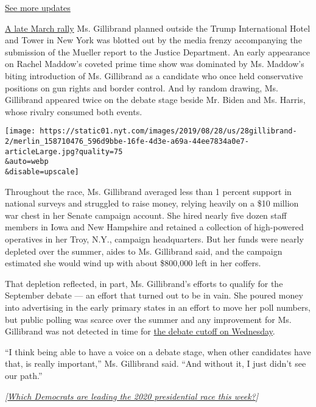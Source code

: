 \href{https://www.nytimes.com/2020/07/31/us/elections/biden-vs-trump.html?action=click\&pgtype=Article\&state=default\&region=MAIN_CONTENT_1\&context=storylines_live_updates}{See
more updates}

\href{https://www.nytimes.com/2019/03/24/us/politics/gillibrand-trump-2020.html}{A
late March rally} Ms. Gillibrand planned outside the Trump International
Hotel and Tower in New York was blotted out by the media frenzy
accompanying the submission of the Mueller report to the Justice
Department. An early appearance on Rachel Maddow's coveted prime time
show was dominated by Ms. Maddow's biting introduction of Ms. Gillibrand
as a candidate who once held conservative positions on gun rights and
border control. And by random drawing, Ms. Gillibrand appeared twice on
the debate stage beside Mr. Biden and Ms. Harris, whose rivalry consumed
both events.

\texttt{[image: https://static01.nyt.com/images/2019/08/28/us/28gillibrand-2/merlin\_158710476\_596d9bbe-16fe-4d3e-a69a-44ee7834a0e7-articleLarge.jpg?quality=75\\\&auto=webp\\\&disable=upscale]}

Throughout the race, Ms. Gillibrand averaged less than 1 percent support
in national surveys and struggled to raise money, relying heavily on a
\$10 million war chest in her Senate campaign account. She hired nearly
five dozen staff members in Iowa and New Hampshire and retained a
collection of high-powered operatives in her Troy, N.Y., campaign
headquarters. But her funds were nearly depleted over the summer, aides
to Ms. Gillibrand said, and the campaign estimated she would wind up
with about \$800,000 left in her coffers.

That depletion reflected, in part, Ms. Gillibrand's efforts to qualify
for the September debate --- an effort that turned out to be in vain.
She poured money into advertising in the early primary states in an
effort to move her poll numbers, but public polling was scarce over the
summer and any improvement for Ms. Gillibrand was not detected in time
for
\href{https://www.nytimes.com/2019/08/28/us/politics/democratic-polls-quinnipiac-suffolk.html}{the
debate cutoff on Wednesday}.

``I think being able to have a voice on a debate stage, when other
candidates have that, is really important,'' Ms. Gillibrand said. ``And
without it, I just didn't see our path.''

\emph{{[}}\href{https://www.nytimes.com/interactive/2020/us/elections/democratic-polls.html?action=click\&module=Intentional\&pgtype=Article}{\emph{Which
Democrats are leading the 2020 presidential race this week?}}\emph{{]}}

